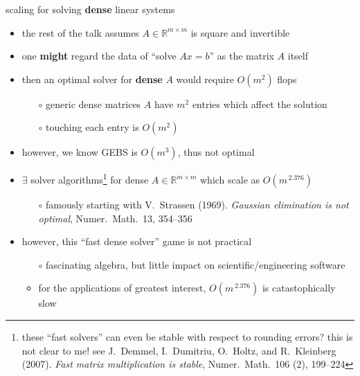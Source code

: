 \documentclass[10pt,
               svgnames,
               hyperref={colorlinks,citecolor=DeepPink4,linkcolor=FireBrick,urlcolor=Maroon},
               usepdftitle=false]{beamer}
\newcommand{\RR}{\mathbb{R}}
\begin{document}
\begin{frame}{scaling for solving \textbf{dense} linear systems}

\begin{itemize}
\item the rest of the talk assumes $A\in\RR^{m\times m}$ is square and invertible
\item one \textbf{might} regard the data of ``solve $Ax=b$'' as the matrix $A$ itself
\item then an optimal solver for \textbf{dense} $A$ would require $O(m^2)$ flops
   \begin{itemize}
   \item[$\circ$] generic dense matrices $A$ have $m^2$ entries which affect the solution
   \item[$\circ$] touching each entry is $O(m^2)$
   \end{itemize}
\item however, we know GEBS is $O(m^3)$, thus not optimal
\item $\exists$ solver algorithms\footnote{these ``fast solvers'' can even be stable with respect to rounding errors? this is not clear to me! see J.~Demmel, I.~Dumitriu, O.~Holtz, and R.~Kleinberg (2007). \emph{Fast matrix multiplication is stable}, Numer.~Math.~106 (2), 199--224} for dense $A\in\RR^{m\times m}$ which scale as $O(m^{\,2.376})$
   \begin{itemize}
   \item[$\circ$] famously starting with V.~Strassen (1969). \emph{Gaussian elimination is not optimal}, Numer.~Math.~13, 354--356
   \end{itemize}
\item however, this ``fast dense solver'' game is not practical
   \begin{itemize}
   \item[$\circ$] fascinating algebra, but little impact on scientific/engineering software
   \item<2>[$\circ$] \alert{for the applications of greatest interest, $O(m^{\,2.376})$ is catastophically slow}
   \end{itemize}
\end{itemize}
\end{frame}
\end{document}
